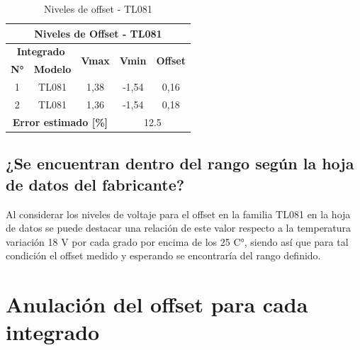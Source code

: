 \begin{table}[]
	\centering
	\begin{tabular}{|ccccc|}
		\hline
		\multicolumn{5}{|c|}{\textbf{Niveles de Offset - TL081}}                                                                                                                                                                \\ \hline
		\multicolumn{2}{|c|}{\textbf{Integrado}}                                 & \multicolumn{1}{c|}{\multirow{2}{*}{\textbf{Vmax}}} & \multicolumn{1}{c|}{\multirow{2}{*}{\textbf{Vmin}}} & \multirow{2}{*}{\textbf{Offset}} \\ \cline{1-2}
		\multicolumn{1}{|c|}{\textbf{N°}} & \multicolumn{1}{c|}{\textbf{Modelo}} & \multicolumn{1}{c|}{}                               & \multicolumn{1}{c|}{}                               &                                  \\ \hline
		\multicolumn{1}{|c|}{1}           & \multicolumn{1}{c|}{TL081}           & \multicolumn{1}{c|}{1,38}                           & \multicolumn{1}{c|}{-1,54}                          & 0,16                             \\ \hline
		\multicolumn{1}{|c|}{2}           & \multicolumn{1}{c|}{TL081}           & \multicolumn{1}{c|}{1,36}                           & \multicolumn{1}{c|}{-1,54}                          & 0,18                             \\ \hline
		\multicolumn{3}{|c|}{\textbf{Error estimado {[}\%{]}}}                                                                         & \multicolumn{2}{c|}{12.5}                                                              \\ \hline
	\end{tabular}
	\caption{Niveles de offset - TL081}
	\label{tab:offset-tl081}
\end{table}

\subsection{¿Se encuentran dentro del rango según la hoja de datos del fabricante?}
Al considerar los niveles de voltaje para el offset en la familia TL081 en la hoja de datos se puede destacar una relación de este valor respecto a la temperatura variación 18 V por cada grado por encima de los 25 C°, siendo así que para tal condición el offset medido y esperando se encontraría del rango definido.

\section{Anulación del offset para cada integrado}


